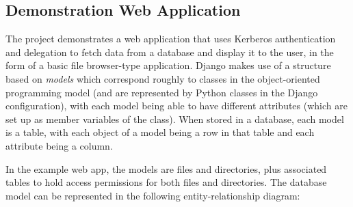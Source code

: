 \documentclass[12pt]{report}
\begin{document}
\subsection{Demonstration Web Application}
The project demonstrates a web application that uses Kerberos authentication and delegation to fetch data from a database and display it to the user, in the form of a basic file browser-type application. Django makes use of a structure based on \textit{models} which correspond roughly to classes in the object-oriented programming model (and are represented by Python classes in the Django configuration), with each model being able to have different attributes (which are set up as member variables of the class). When stored in a database, each model is a table, with each object of a model being a row in that table and each attribute being a column.

In the example web app, the models are files and directories, plus associated tables to hold access permissions for both files and directories. The database model can be represented in the following entity-relationship diagram:
\end{document}
